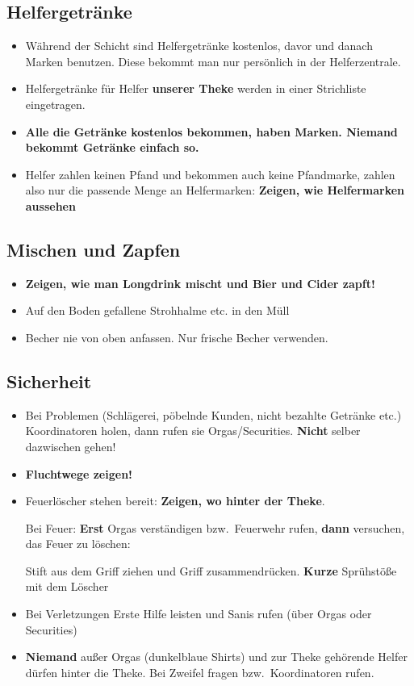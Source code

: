 \subsection{Helfergetränke}
\begin{itemize}
        \renewcommand{\labelitemi}{$\Box$}
    \item Während der Schicht sind Helfergetränke kostenlos, davor und danach Marken benutzen. Diese bekommt man nur persönlich in der Helferzentrale.
    \item Helfergetränke für Helfer \textbf{unserer Theke} werden in einer Strichliste eingetragen.
    \item \textbf{Alle die Getränke kostenlos bekommen, haben Marken. Niemand bekommt Getränke einfach so.}
    \item Helfer zahlen keinen Pfand und bekommen auch keine Pfandmarke, zahlen also nur die passende Menge an Helfermarken: \textbf{Zeigen, wie Helfermarken aussehen}
\end{itemize}
\subsection{Mischen und Zapfen}
\begin{itemize}
        \renewcommand{\labelitemi}{$\Box$}
    \item \textbf{Zeigen, wie man Longdrink mischt und Bier und Cider zapft!}
    \item Auf den Boden gefallene Strohhalme etc. in den Müll
    \item Becher nie von oben anfassen. Nur frische Becher verwenden.
\end{itemize}
\subsection{Sicherheit}
\begin{itemize}
        \renewcommand{\labelitemi}{$\Box$}
    \item Bei Problemen (Schlägerei, pöbelnde Kunden, nicht bezahlte Getränke etc.) Koordinatoren holen, dann rufen sie Orgas/Securities. \textbf{Nicht} selber dazwischen gehen!
    \item \textbf{Fluchtwege zeigen!}
    \item Feuerlöscher stehen bereit: \textbf{Zeigen, wo hinter der Theke}.

        Bei Feuer: \textbf{Erst} Orgas verständigen bzw.\ Feuerwehr rufen, \textbf{dann} versuchen, das Feuer zu löschen:

        Stift aus dem Griff ziehen und Griff zusammendrücken. \textbf{Kurze} Sprühstöße mit dem Löscher
    \item Bei Verletzungen Erste Hilfe leisten und Sanis rufen (über Orgas oder Securities)
    \item \textbf{Niemand} außer Orgas (dunkelblaue Shirts) und zur Theke gehörende Helfer dürfen hinter die Theke. Bei Zweifel fragen bzw.\ Koordinatoren rufen.
\end{itemize}

